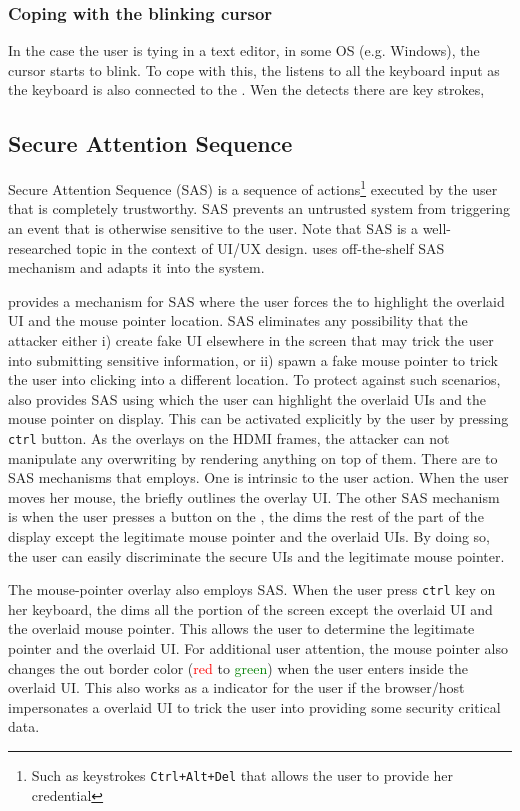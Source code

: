 \subsubsection{Coping with the blinking cursor} In the case the user is tying in a text editor, in some OS (e.g. Windows), the cursor starts to blink. To cope with this, the \device listens to all the keyboard input as the keyboard is also connected to the \device. Wen the \device detects there are key strokes,






\subsection{Secure Attention Sequence}
\label{sec:systemDesign:SAS}

Secure Attention Sequence (SAS) is a sequence of actions\footnote{Such as keystrokes \texttt{Ctrl+Alt+Del} that allows the user to provide her credential} executed by the user that is completely trustworthy. SAS prevents an untrusted system from triggering an event that is otherwise sensitive to the user. Note that SAS is a well-researched topic in the context of UI/UX design. \name uses off-the-shelf SAS mechanism and adapts it into the system. 

\name provides a mechanism for SAS where the user forces the \device to highlight the overlaid UI and the mouse pointer location. SAS eliminates any possibility that the attacker either i) create fake UI elsewhere in the screen that may trick the user into submitting sensitive information, or ii) spawn a fake mouse pointer to trick the user into clicking into a different location. To protect against such scenarios, \device also provides SAS using which the user can highlight the overlaid UIs and the mouse pointer on display. 
This can be activated explicitly by the user by pressing \texttt{ctrl} button.
As the \device overlays on the HDMI frames, the attacker can not manipulate any overwriting by rendering anything on top of them. 
There are to SAS mechanisms that \name employs. One is intrinsic to the user action. When the user moves her mouse, the \device briefly outlines the overlay UI. The other SAS mechanism is when the user presses a button on the \device, the \device dims the rest of the part of the display except the legitimate mouse pointer and the overlaid UIs. By doing so, the user can easily discriminate the secure UIs and the legitimate mouse pointer.

 The mouse-pointer overlay also employs SAS. When the user press \texttt{ctrl} key on her keyboard, the \device dims all the portion of the screen except the overlaid UI and the overlaid mouse pointer. This allows the user to determine the legitimate pointer and the overlaid UI. For additional user attention, the mouse pointer also changes the out border color (\textcolor{red}{red} to \textcolor{green}{green}) when the user enters inside the overlaid UI. This also works as a indicator for the user if the browser/host impersonates a overlaid UI to trick the user into providing some security critical data.
 

